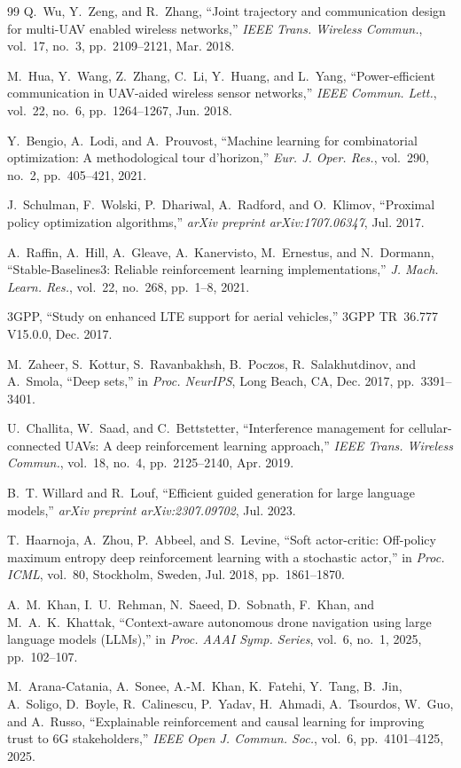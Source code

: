 \documentclass[journal]{IEEEtran}
\begin{document}
\begin{thebibliography}{99}
Q.~Wu, Y.~Zeng, and R.~Zhang, ``Joint trajectory and communication design for multi-UAV enabled wireless networks,'' \textit{IEEE Trans. Wireless Commun.}, vol.~17, no.~3, pp.~2109--2121, Mar. 2018.

M.~Hua, Y.~Wang, Z.~Zhang, C.~Li, Y.~Huang, and L.~Yang, ``Power-efficient communication in UAV-aided wireless sensor networks,'' \textit{IEEE Commun. Lett.}, vol.~22, no.~6, pp.~1264--1267, Jun. 2018.

Y.~Bengio, A.~Lodi, and A.~Prouvost, ``Machine learning for combinatorial optimization: A methodological tour d'horizon,'' \textit{Eur. J. Oper. Res.}, vol.~290, no.~2, pp.~405--421, 2021.

J.~Schulman, F.~Wolski, P.~Dhariwal, A.~Radford, and O.~Klimov, ``Proximal policy optimization algorithms,'' \textit{arXiv preprint arXiv:1707.06347}, Jul. 2017.

A.~Raffin, A.~Hill, A.~Gleave, A.~Kanervisto, M.~Ernestus, and N.~Dormann, ``Stable-Baselines3: Reliable reinforcement learning implementations,'' \textit{J. Mach. Learn. Res.}, vol.~22, no.~268, pp.~1--8, 2021.

3GPP, ``Study on enhanced LTE support for aerial vehicles,'' 3GPP TR~36.777 V15.0.0, Dec. 2017.

M.~Zaheer, S.~Kottur, S.~Ravanbakhsh, B.~Poczos, R.~Salakhutdinov, and A.~Smola, ``Deep sets,'' in \textit{Proc. NeurIPS}, Long Beach, CA, Dec. 2017, pp.~3391--3401.

U.~Challita, W.~Saad, and C.~Bettstetter, ``Interference management for cellular-connected UAVs: A deep reinforcement learning approach,'' \textit{IEEE Trans. Wireless Commun.}, vol.~18, no.~4, pp.~2125--2140, Apr. 2019.

B.~T. Willard and R.~Louf, ``Efficient guided generation for large language models,'' \textit{arXiv preprint arXiv:2307.09702}, Jul. 2023.

T.~Haarnoja, A.~Zhou, P.~Abbeel, and S.~Levine, ``Soft actor-critic: Off-policy maximum entropy deep reinforcement learning with a stochastic actor,'' in \textit{Proc. ICML}, vol.~80, Stockholm, Sweden, Jul. 2018, pp.~1861--1870.

A.~M.~Khan, I.~U.~Rehman, N.~Saeed, D.~Sobnath, F.~Khan, and M.~A.~K.~Khattak, ``Context-aware autonomous drone navigation using large language models (LLMs),'' in \textit{Proc. AAAI Symp. Series}, vol.~6, no.~1, 2025, pp.~102--107.

M.~Arana-Catania, A.~Sonee, A.-M.~Khan, K.~Fatehi, Y.~Tang, B.~Jin, A.~Soligo, D.~Boyle, R.~Calinescu, P.~Yadav, H.~Ahmadi, A.~Tsourdos, W.~Guo, and A.~Russo, ``Explainable reinforcement and causal learning for improving trust to 6G stakeholders,'' \textit{IEEE Open J. Commun. Soc.}, vol.~6, pp.~4101--4125, 2025.

\end{thebibliography}
\end{document}
